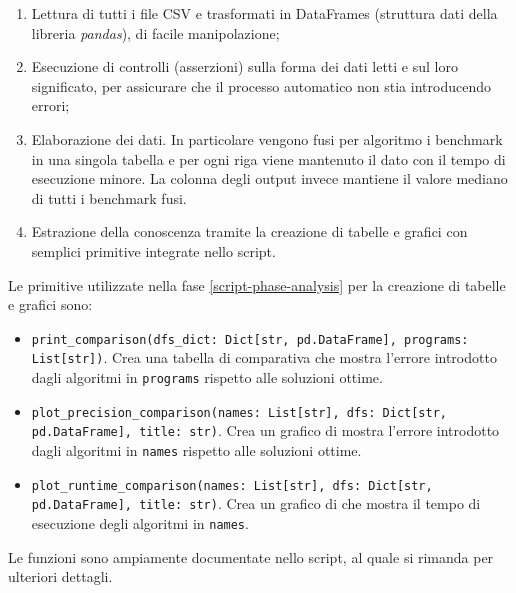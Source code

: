 \begin{enumerate}
    \item Lettura di tutti i file CSV e trasformati in DataFrames
      (struttura dati della libreria \emph{pandas}), di facile
      manipolazione;
    \item Esecuzione di controlli (asserzioni) sulla forma dei dati
      letti e sul loro significato, per assicurare che il processo
      automatico non stia introducendo errori;
    \item Elaborazione dei dati. In particolare vengono fusi per
      algoritmo i benchmark in una singola tabella e per ogni riga
      viene mantenuto il dato con il tempo di esecuzione minore. La
      colonna degli output invece mantiene il valore mediano di tutti
      i benchmark fusi.
    \item Estrazione della conoscenza tramite la creazione di tabelle
      e grafici con semplici primitive integrate nello script.
    \label{script-phase-analysis}
\end{enumerate}

\noindent Le primitive utilizzate nella fase
\ref{script-phase-analysis} per la creazione di tabelle e grafici
sono:

\begin{itemize}
    \item \texttt{print_comparison(dfs_dict: Dict[str,
        pd.DataFrame], programs: List[str])}. Crea una tabella di
      comparativa che mostra l'errore introdotto dagli algoritmi in
      \texttt{programs} rispetto alle soluzioni ottime.

    \item \texttt{plot_precision_comparison(names:
      List[str], dfs: Dict[str, pd.DataFrame], title: str)}. Crea un
      grafico di mostra l'errore introdotto dagli algoritmi in
      \texttt{names} rispetto alle soluzioni ottime.

    \item \texttt{plot_runtime_comparison(names:
      List[str], dfs: Dict[str, pd.DataFrame], title: str)}. Crea un
      grafico di che mostra il tempo di esecuzione degli algoritmi in
      \texttt{names}.
    
\end{itemize}

\noindent Le funzioni sono ampiamente documentate nello script, al
quale si rimanda per ulteriori dettagli.
